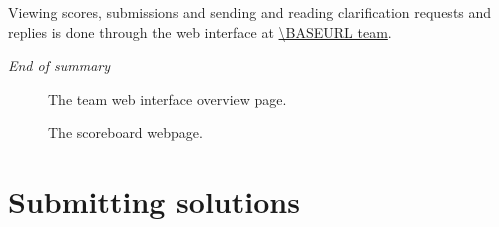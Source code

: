 Viewing scores, submissions and sending and reading clarification
requests and replies is done through the web interface at
\url{\BASEURL team}.

\emph{End of summary}

\begin{figure}[p]
  \centering
  \caption{The team web interface overview page.}
  \label{fig:team-overview}
\end{figure}

\begin{figure}[p]
  \centering
  \caption{The scoreboard webpage.}
  \label{fig:team-scoreboard}
\end{figure}

\newpage

\section{Submitting solutions}\label{submit}

